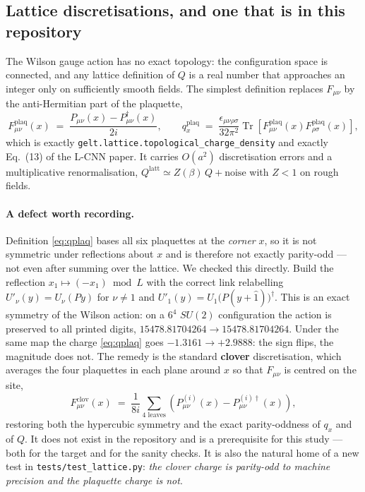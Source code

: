 \documentclass[11pt,a4paper]{article}
\begin{document}
\subsection{Lattice discretisations, and one that is in this repository}

The Wilson gauge action has no exact topology: the configuration space is
connected, and any lattice definition of $Q$ is a real number that approaches an
integer only on sufficiently smooth fields. The simplest definition replaces
$F_{\mu\nu}$ by the anti-Hermitian part of the plaquette,
\begin{equation}
  F^{\mathrm{plaq}}_{\mu\nu}(x) \;=\; \frac{P_{\mu\nu}(x) - P^{\dagger}_{\mu\nu}(x)}{2i},
  \qquad
  q^{\mathrm{plaq}}_x \;=\; \frac{\epsilon_{\mu\nu\rho\sigma}}{32\pi^2}
    \operatorname{Tr}\!\left[F^{\mathrm{plaq}}_{\mu\nu}(x) F^{\mathrm{plaq}}_{\rho\sigma}(x)\right],
  \label{eq:qplaq}
\end{equation}
which is exactly \texttt{gelt.lattice.topological\_charge\_density} and exactly
Eq.~(13) of the L-CNN paper. It carries $O(a^2)$ discretisation errors and a
multiplicative renormalisation, $Q^{\mathrm{latt}} \simeq Z(\beta)\,Q + \text{noise}$
with $Z < 1$ on rough fields.

\paragraph{A defect worth recording.} Definition \eqref{eq:qplaq} bases all six
plaquettes at the \emph{corner} $x$, so it is not symmetric under reflections
about $x$ and is therefore not exactly parity-odd --- not even after summing
over the lattice. We checked this directly. Build the reflection
$x_1 \mapsto (-x_1) \bmod L$ with the correct link relabelling
$U'_{\nu}(y) = U_{\nu}(Py)$ for $\nu \neq 1$ and
$U'_{1}(y) = U_{1}\!\big(P(y+\hat{1})\big)^{\dagger}$. This is an exact symmetry
of the Wilson action: on a $6^4$ $SU(2)$ configuration the action is preserved to
all printed digits, $15478.81704264 \to 15478.81704264$. Under the same map the
charge \eqref{eq:qplaq} goes $-1.3161 \to +2.9888$: the sign flips, the magnitude
does not. The remedy is the standard \textbf{clover} discretisation, which
averages the four plaquettes in each plane around $x$ so that $F_{\mu\nu}$ is
centred on the site,
\begin{equation}
  F^{\mathrm{clov}}_{\mu\nu}(x) \;=\; \frac{1}{8i}
    \sum_{\text{4 leaves}} \left(P^{(i)}_{\mu\nu}(x) - P^{(i)\dagger}_{\mu\nu}(x)\right),
  \label{eq:qclov}
\end{equation}
restoring both the hypercubic symmetry and the exact parity-oddness of $q_x$ and
of $Q$. It does not exist in the repository and is a prerequisite for this
study --- both for the target and for the sanity checks. It is also the natural
home of a new test in \texttt{tests/test\_lattice.py}: \emph{the clover charge is
parity-odd to machine precision and the plaquette charge is not}.
\end{document}

